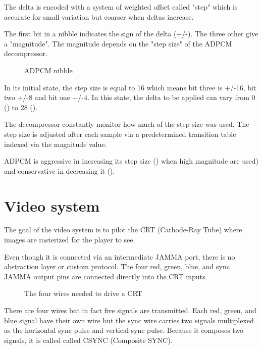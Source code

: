 The delta is encoded with a system of weighted offset called "step" which is accurate for small variation but coarser when deltas increase. 

The first bit in a nibble indicates the sign of the delta (+/-). The three other give a "magnitude". The magnitude depends on the "step size" of the ADPCM decompressor.

\begin{figure}[H]
\caption*{ADPCM nibble}
\end{figure}


In its initial state, the step size is equal to 16 which means bit three is +/-16, bit two +/-8 and bit one +/-4. In this state, the delta to be applied can vary from 0 () to 28 (). 

The decompressor constantly monitor how much of the step size was used. The step size is adjusted after each sample via a  predetermined transition table indexed via the magnitude value. 




ADPCM is aggressive in increasing its step size () when high magnitude are used) and conservative in decreasing it ().








\pagebreak
\section{Video system}
The goal of the video system is to pilot the CRT (Cathode-Ray Tube) where images are rasterized for the player to see.

Even though it is connected via an intermediate JAMMA port, there is no abstraction layer or custom protocol. The four red, green, blue, and sync JAMMA output pins are connected directly into the CRT inputs.

\begin{figure}[H]
\caption*{The four wires needed to drive a CRT}
\end{figure}


There are four wires but in fact five signals are transmitted. Each red, green, and blue signal have their own wire but the sync wire carries two signals multiplexed as the horizontal sync pulse and vertical sync pulse. Because it composes two signals, it is called called CSYNC (Composite SYNC). 

